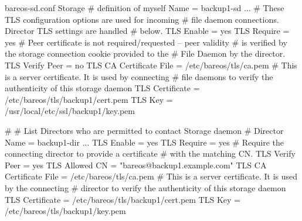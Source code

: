\begin{bconfig}{bareos-sd.conf}
Storage {                             # definition of myself
    Name = backup1-sd
    ...
    # These TLS configuration options are used for incoming
    # file daemon connections. Director TLS settings are handled
    # below.
    TLS Enable = yes
    TLS Require = yes
    # Peer certificate is not required/requested -- peer validity
    # is verified by the storage connection cookie provided to the
    # File Daemon by the director.
    TLS Verify Peer = no
    TLS CA Certificate File = /etc/bareos/tls/ca.pem
    # This is a server certificate. It is used by connecting
    # file daemons to verify the authenticity of this storage daemon
    TLS Certificate = /etc/bareos/tls/backup1/cert.pem
    TLS Key = /usr/local/etc/ssl/backup1/key.pem
}

#
# List Directors who are permitted to contact Storage daemon
#
Director {
    Name = backup1-dir
    ...
    TLS Enable = yes
    TLS Require = yes
    # Require the connecting director to provide a certificate
    # with the matching CN.
    TLS Verify Peer = yes
    TLS Allowed CN = "bareos@backup1.example.com"
    TLS CA Certificate File = /etc/bareos/tls/ca.pem
    # This is a server certificate. It is used by the connecting
    # director to verify the authenticity of this storage daemon
    TLS Certificate = /etc/bareos/tls/backup1/cert.pem
    TLS Key = /etc/bareos/tls/backup1/key.pem
}
\end{bconfig}
